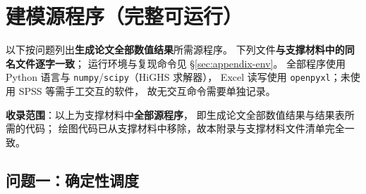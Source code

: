 \section{建模源程序（完整可运行）}
\label{sec:appendix-source}

以下按问题列出\textbf{生成论文全部数值结果}所需源程序。
下列文件\textbf{与支撑材料中的同名文件逐字一致}；
运行环境与复现命令见 \S\ref{sec:appendix-env}。
全部程序使用 Python 语言与 \texttt{numpy}/\texttt{scipy}（HiGHS 求解器），
Excel 读写使用 \texttt{openpyxl}；未使用 SPSS 等需手工交互的软件，
故无交互命令需要单独记录。

\textbf{收录范围}：以上为支撑材料中\textbf{全部源程序}，
即生成论文全部数值结果与结果表所需的代码；
绘图代码已从支撑材料中移除，故本附录与支撑材料文件清单完全一致。

\begingroup
\footnotesize
\setlength{\parindent}{0pt}
\setlength{\parskip}{0pt}

\subsection{问题一：确定性调度}

